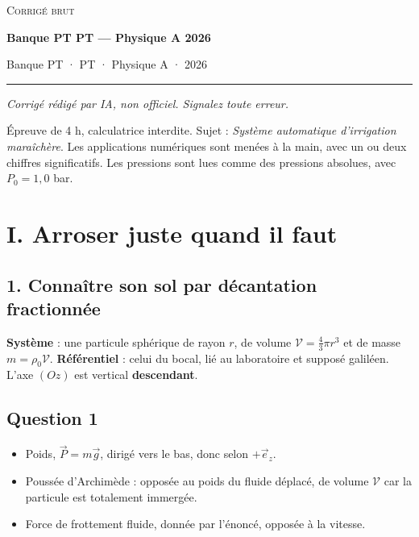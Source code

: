 \documentclass[11pt,a4paper]{article}
\providecommand{\tightlist}{\setlength{\itemsep}{0pt}\setlength{\parskip}{0pt}}
\begin{document}
\thispagestyle{plain}
\begin{center}
  {\small\scshape Corrigé brut}\par\smallskip
  {\LARGE\bfseries Banque PT PT — Physique A 2026\par}\medskip
  {\large Banque PT · PT · Physique A · 2026\par}
\end{center}
\vspace{2pt}\hrule\vspace{8pt}

\emph{Corrigé rédigé par IA, non officiel. Signalez toute erreur.}

Épreuve de 4 h, calculatrice interdite. Sujet : \emph{Système automatique d'irrigation maraîchère}. Les applications numériques sont menées à la main, avec un ou deux chiffres significatifs. Les pressions sont lues comme des pressions absolues, avec \(P_0=1{,}0\) bar.

\hypertarget{i.-arroser-juste-quand-il-faut}{%
\section{I. Arroser juste quand il faut}\label{i.-arroser-juste-quand-il-faut}}

\hypertarget{connauxeetre-son-sol-par-duxe9cantation-fractionnuxe9e}{%
\subsection{1. Connaître son sol par décantation fractionnée}\label{connauxeetre-son-sol-par-duxe9cantation-fractionnuxe9e}}

\textbf{Système} : une particule sphérique de rayon \(r\), de volume \(\mathcal V=\frac43\pi r^3\) et de masse \(m=\rho_0\mathcal V\). \textbf{Référentiel} : celui du bocal, lié au laboratoire et supposé galiléen. L'axe \((Oz)\) est vertical \textbf{descendant}.

\hypertarget{question-1}{%
\subsection{Question 1}\label{question-1}}

\begin{itemize}
\tightlist
\item
  Poids, \(\vec P=m\vec g\), dirigé vers le bas, donc selon \(+\vec e_z\).
\item
  Poussée d'Archimède : opposée au poids du fluide déplacé, de volume \(\mathcal V\) car la particule est totalement immergée.
\item
  Force de frottement fluide, donnée par l'énoncé, opposée à la vitesse.
\end{itemize}
\end{document}
